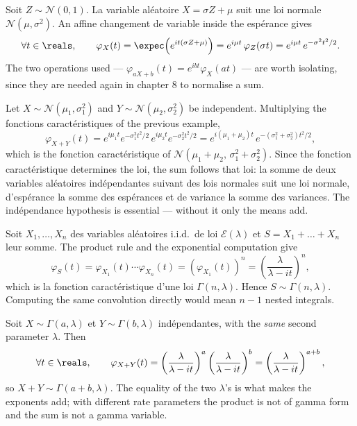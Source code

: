 \begin{example}
Soit $Z \sim \mathcal{N}(0,1)$. La variable aléatoire $X = \sigma Z + \mu$ suit une loi normale
$\mathcal{N}(\mu,\sigma^{2})$. An affine changement de variable inside the espérance gives
\[
  \forall t \in \reals, \qquad \varphi_{X}(t) = \expec\!\left(e^{it(\sigma Z + \mu)}\right)
  = e^{i\mu t}\,\varphi_{Z}(\sigma t) = e^{i\mu t}\,e^{-\sigma^{2}t^{2}/2}.
\]
The two operations used --- $\varphi_{aX+b}(t) = e^{ibt}\varphi_{X}(at)$ --- are worth
isolating, since they are needed again in chapter 8 to normalise a sum.
\end{example}

\begin{example}
Let $X \sim \mathcal{N}(\mu_{1},\sigma_{1}^{2})$ and $Y \sim
\mathcal{N}(\mu_{2},\sigma_{2}^{2})$ be independent. Multiplying the fonctions
caractéristiques of the previous example,
\[
  \varphi_{X+Y}(t) = e^{i\mu_{1}t}e^{-\sigma_{1}^{2}t^{2}/2}\,
  e^{i\mu_{2}t}e^{-\sigma_{2}^{2}t^{2}/2} = e^{i(\mu_{1}+\mu_{2})t}\,
  e^{-\left(\sigma_{1}^{2}+\sigma_{2}^{2}\right)t^{2}/2},
\]
which is the fonction caractéristique of
$\mathcal{N}(\mu_{1}+\mu_{2},\,\sigma_{1}^{2}+\sigma_{2}^{2})$. Since the fonction
caractéristique determines the loi, the sum follows that loi: la somme de deux variables
aléatoires indépendantes suivant des lois normales suit une loi normale, d'espérance la somme
des espérances et de variance la somme des variances. The indépendance hypothesis
is essential --- without it only the means add.
\end{example}

\begin{example}
Soit $X_{1},\dots,X_{n}$ des variables aléatoires i.i.d.\ de loi $\mathcal{E}(\lambda)$ et
$S = X_{1} + \dots + X_{n}$ leur somme. The product rule and the exponential computation give
\[
  \varphi_{S}(t) = \varphi_{X_{1}}(t)\cdots\varphi_{X_{n}}(t) =
  \left(\varphi_{X_{1}}(t)\right)^{n} = \left(\frac{\lambda}{\lambda - it}\right)^{n},
\]
which is la fonction caractéristique d'une loi $\Gamma(n,\lambda)$. Hence $S \sim
\Gamma(n,\lambda)$. Computing the same convolution directly would mean $n-1$ nested
integrals.
\end{example}

\begin{example}
Soit $X \sim \Gamma(a,\lambda)$ et $Y \sim \Gamma(b,\lambda)$ indépendantes, with the
\emph{same} second parameter $\lambda$. Then
\[
  \forall t \in \reals, \qquad \varphi_{X+Y}(t) = \left(\frac{\lambda}{\lambda -
  it}\right)^{a} \left(\frac{\lambda}{\lambda - it}\right)^{b} =
  \left(\frac{\lambda}{\lambda - it}\right)^{a+b},
\]
so $X + Y \sim \Gamma(a+b,\lambda)$. The equality of the two $\lambda$'s is what makes the
exponents add; with different rate parameters the product is not of gamma form and the sum
is not a gamma variable.
\end{example}

